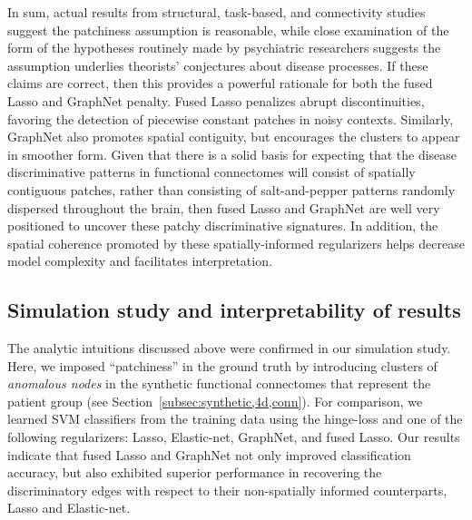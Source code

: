 In sum, actual results from structural, task-based, and connectivity studies suggest the patchiness assumption is reasonable, while close examination of the form of the hypotheses routinely made by psychiatric researchers suggests the assumption underlies theorists' conjectures about disease processes. 
If these claims are correct, then this provides a powerful rationale for both the fused Lasso and GraphNet penalty. 
Fused Lasso penalizes abrupt discontinuities, favoring the detection of piecewise constant patches in noisy contexts. 
Similarly, GraphNet also promotes spatial contiguity, but encourages the clusters to appear in smoother form.
Given that there is a solid basis for expecting that the disease discriminative patterns in functional connectomes will consist of spatially contiguous patches, rather than consisting of salt-and-pepper patterns randomly dispersed throughout the brain, then fused Lasso and GraphNet are well very positioned to uncover these patchy discriminative signatures. 
In addition, the spatial coherence promoted by these spatially-informed regularizers helps decrease model complexity and facilitates interpretation.

\subsection{Simulation study and interpretability of results}
The analytic intuitions discussed above were confirmed in our simulation study.
Here, we imposed ``patchiness'' in the ground truth by introducing clusters of \emph{anomalous nodes} in the synthetic functional connectomes that represent the patient group (see Section~\ref{subsec:synthetic,4d,conn}).
For comparison, we learned SVM classifiers from the training data using the hinge-loss and one of the following regularizers: Lasso, Elastic-net, GraphNet, and fused Lasso.
Our results indicate that fused Lasso and GraphNet not only improved classification accuracy, but also exhibited superior performance in recovering the discriminatory edges with respect to their non-spatially informed counterparts, Lasso and Elastic-net.

